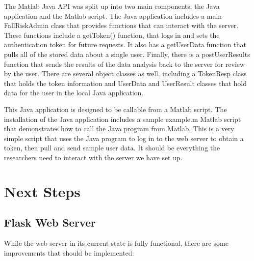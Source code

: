\documentclass[conference]{IEEEtran}
\begin{document}
The Matlab Java API was split up into two main components: the Java application and the Matlab script. The Java application includes a main FallRiskAdmin class that provides functions that can interact with the server. These functions include a getToken() function, that logs in and sets the authentication token for future requests. It also has a getUserData function that pulls all of the stored data about a single user. Finally, there is a postUserResults function that sends the results of the data analysis back to the server for review by the user. There are several object classes as well, including a TokenResp class that holds the token information and UserData and UserResult classes that hold data for the user in the local Java application.

This Java application is designed to be callable from a Matlab script. The installation of the Java application includes a sample example.m Matlab script that demonstrates how to call the Java program from Matlab. This is a very simple script that uses the Java program to log in to the web server to obtain a token, then pull and send sample user data. It should be everything the researchers need to interact with the server we have set up. 

\section{Next Steps}

\subsection{Flask Web Server}

While the web server in its current state is fully functional, there are some improvements that should be implemented:
\end{document}
